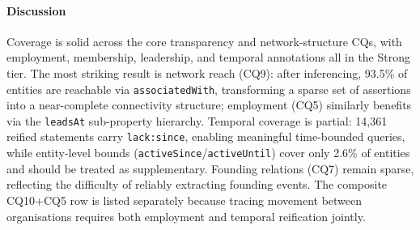 \paragraph{Discussion}
Coverage is solid across the core transparency and network-structure CQs, with employment, membership, leadership, and temporal annotations all in the Strong tier.
The most striking result is network reach (CQ9): after inferencing, 93.5\% of entities are reachable via \texttt{associatedWith}, transforming a sparse set of assertions into a near-complete connectivity structure; employment (CQ5) similarly benefits via the \texttt{leadsAt} sub-property hierarchy.
Temporal coverage is partial: 14{,}361 reified statements carry \texttt{lack:since}, enabling meaningful time-bounded queries, while entity-level bounds (\texttt{activeSince}/\texttt{activeUntil}) cover only 2.6\% of entities and should be treated as supplementary.
Founding relations (CQ7) remain sparse, reflecting the difficulty of reliably extracting founding events.
The composite CQ10+CQ5 row is listed separately because tracing movement between organisations requires both employment and temporal reification jointly.



